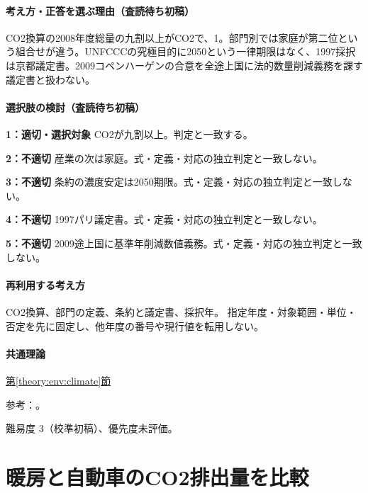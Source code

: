 \paragraph{考え方・正答を選ぶ理由（査読待ち初稿）} CO2換算の2008年度総量の九割以上がCO2で、1。部門別では家庭が第二位という組合せが違う。UNFCCCの究極目的に2050という一律期限はなく、1997採択は京都議定書。2009コペンハーゲンの合意を全途上国に法的数量削減義務を課す議定書と扱わない。

\paragraph{選択肢の検討（査読待ち初稿）}\mbox{}\par

\noindent\textbf{1：適切・選択対象} CO2が九割以上。判定と一致する。\par

\noindent\textbf{2：不適切} 産業の次は家庭。式・定義・対応の独立判定と一致しない。\par

\noindent\textbf{3：不適切} 条約の濃度安定は2050期限。式・定義・対応の独立判定と一致しない。\par

\noindent\textbf{4：不適切} 1997パリ議定書。式・定義・対応の独立判定と一致しない。\par

\noindent\textbf{5：不適切} 2009途上国に基準年削減数値義務。式・定義・対応の独立判定と一致しない。\par

\paragraph{再利用する考え方} CO2換算、部門の定義、条約と議定書、採択年。 指定年度・対象範囲・単位・否定を先に固定し、他年度の番号や現行値を転用しない。

\paragraph{共通理論} \hyperref[theory:env:climate]{第\ref*{theory:env:climate}節}

\par 参考：\cite{env58_ghg2008}。

\par 難易度 3（校準初稿）、優先度未評価。

\section{暖房と自動車のCO2排出量を比較}

